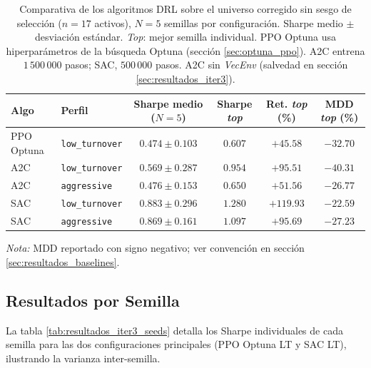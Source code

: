 \documentclass[IB,a4paper]{TFUOC}
\begin{document}
\begin{table}[h]
\centering
\small
\setlength{\tabcolsep}{4pt}
\renewcommand{\arraystretch}{1.20}
\begin{tabular}{|l|l|c|c|c|c|}
\hline
\textbf{Algo} & \textbf{Perfil} & \textbf{Sharpe medio ($N=5$)} & \textbf{Sharpe \textit{top}} & \textbf{Ret. \textit{top} (\%)} & \textbf{MDD \textit{top} (\%)} \\ \hline
PPO Optuna & \texttt{low\_turnover} & $0.474 \pm 0.103$ & $\mathbf{0.607}$ & $+45.58$ & $-32.70$ \\ \hline
A2C & \texttt{low\_turnover} & $0.569 \pm 0.287$ & $\mathbf{0.954}$ & $+95.51$ & $-40.31$ \\ \hline
A2C & \texttt{aggressive}    & $0.476 \pm 0.153$ & $0.650$ & $+51.56$ & $-26.77$ \\ \hline
SAC & \texttt{low\_turnover} & $\mathbf{0.883} \pm 0.296$ & $\mathbf{1.280}$ & $+119.93$ & $-22.59$ \\ \hline
SAC & \texttt{aggressive}    & $0.869 \pm 0.161$ & $1.097$ & $+95.69$ & $-27.23$ \\ \hline
\end{tabular}
\caption[Comparativa multi-algoritmo DRL (PPO/A2C/SAC) sobre universo corregido sin sesgo de selección, $n=17$.]{Comparativa de los algoritmos DRL sobre el universo corregido sin sesgo de selección ($n=17$ activos), $N=5$ semillas por configuración. Sharpe medio $\pm$ desviación estándar. \textit{Top}: mejor semilla individual. PPO Optuna usa hiperparámetros de la búsqueda Optuna (sección \ref{sec:optuna_ppo}). A2C entrena $1\,500\,000$ pasos; SAC, $500\,000$ pasos. A2C sin \textit{VecEnv} (salvedad en sección \ref{sec:resultados_iter3}).}
\label{tab:resultados_iter3}
\end{table}

\noindent\textit{Nota:} MDD reportado con signo negativo; ver convención en sección \ref{sec:resultados_baselines}.

\subsection{Resultados por Semilla}

La tabla \ref{tab:resultados_iter3_seeds} detalla los Sharpe individuales de cada semilla para las dos configuraciones principales (PPO Optuna LT y SAC LT), ilustrando la varianza inter-semilla.
\end{document}
